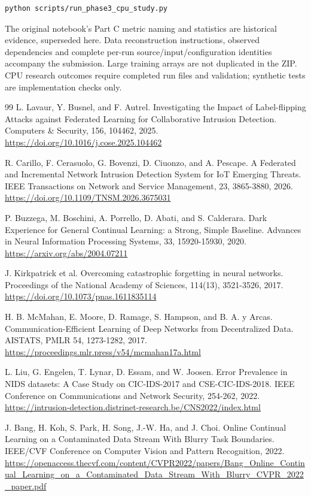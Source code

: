\documentclass[
  10pt,
  a4paper,
]{article}
\begin{document}
\begin{verbatim}
python scripts/run_phase3_cpu_study.py
\end{verbatim}

The original notebook's Part C metric naming and statistics are
historical evidence, superseded here. Data reconstruction instructions,
observed dependencies and complete per-run source/input/configuration
identities accompany the submission. Large training arrays are not
duplicated in the ZIP. CPU research outcomes require completed run files
and validation; synthetic tests are implementation checks only.

\begin{thebibliography}{99}
 L. Lavaur, Y. Busnel, and F. Autrel. Investigating the Impact of Label-flipping Attacks against Federated Learning for Collaborative Intrusion Detection. Computers \& Security, 156, 104462, 2025. \url{https://doi.org/10.1016/j.cose.2025.104462}

 R. Carillo, F. Cerasuolo, G. Bovenzi, D. Ciuonzo, and A. Pescape. A Federated and Incremental Network Intrusion Detection System for IoT Emerging Threats. IEEE Transactions on Network and Service Management, 23, 3865-3880, 2026. \url{https://doi.org/10.1109/TNSM.2026.3675031}

 P. Buzzega, M. Boschini, A. Porrello, D. Abati, and S. Calderara. Dark Experience for General Continual Learning: a Strong, Simple Baseline. Advances in Neural Information Processing Systems, 33, 15920-15930, 2020. \url{https://arxiv.org/abs/2004.07211}

 J. Kirkpatrick et al. Overcoming catastrophic forgetting in neural networks. Proceedings of the National Academy of Sciences, 114(13), 3521-3526, 2017. \url{https://doi.org/10.1073/pnas.1611835114}

 H. B. McMahan, E. Moore, D. Ramage, S. Hampson, and B. A. y Arcas. Communication-Efficient Learning of Deep Networks from Decentralized Data. AISTATS, PMLR 54, 1273-1282, 2017. \url{https://proceedings.mlr.press/v54/mcmahan17a.html}

 L. Liu, G. Engelen, T. Lynar, D. Essam, and W. Joosen. Error Prevalence in NIDS datasets: A Case Study on CIC-IDS-2017 and CSE-CIC-IDS-2018. IEEE Conference on Communications and Network Security, 254-262, 2022. \url{https://intrusion-detection.distrinet-research.be/CNS2022/index.html}

 J. Bang, H. Koh, S. Park, H. Song, J.-W. Ha, and J. Choi. Online Continual Learning on a Contaminated Data Stream With Blurry Task Boundaries. IEEE/CVF Conference on Computer Vision and Pattern Recognition, 2022. \url{https://openaccess.thecvf.com/content/CVPR2022/papers/Bang_Online_Continual_Learning_on_a_Contaminated_Data_Stream_With_Blurry_CVPR_2022_paper.pdf}


\end{thebibliography}
\end{document}
